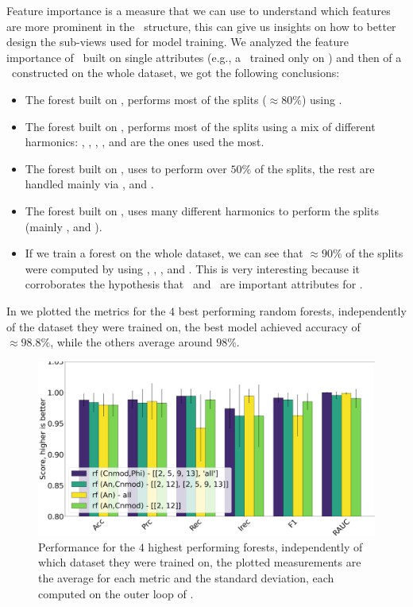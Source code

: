 Feature importance is a measure that we can use to understand which features are more prominent in
the \rf\ structure, this can give us insights on how to better design the sub-views used for model
training. We analyzed the feature importance of \rfs\ built on single attributes (e.g., a \rf\
trained only on \an) and then of a \rf\ constructed on the whole dataset, we got the following
conclusions:
\begin{itemize}
	\item The forest built on \an, performs most of the splits ($\approx 80\%$) using \an[2].
	\item The forest built on \bn, performs most of the splits using a mix of different
	      harmonics: \bn[6], \bn[9], \bn[3], \bn[14], \bn[7] and \bn[5] are the ones used the most.
	\item The forest built on \cnmod, uses \cnmod[2] to perform over $50\%$ of the splits, the
	      rest are handled mainly via \cnmod[5], \cnmod[9] and \cnmod[13].
	\item The forest built on \phin, uses many different harmonics to perform the splits (mainly
	      \phin[10], \phin[12] and \phin[6]).
	\item If we train a forest on the whole dataset, we can see that $\approx90\%$ of the splits
	      were computed by using \cnmod[2], \cnmod[3], \an[12], \an[2] and \an[14]. This is very
	      interesting because it corroborates the hypothesis that \cnmod\ and \an\ are
	      important attributes for \qrp.
\end{itemize}

In  we plotted the metrics for the $4$ best performing random forests,
independently of the dataset they were trained on, the best model achieved accuracy of
$\approx 98.8\%$, while the others average around $98\%$.
\begin{figure}[!ht]
	\centering
	\includegraphics[width=0.7\linewidth]{img/best_rfs.png}
	\caption{Performance for the $4$ highest performing forests, independently of which
		dataset they were trained on, the plotted measurements are the average for each metric and
		the standard deviation, each computed on the outer loop of \ncv.} \label{fig:best-rfs}
\end{figure}

